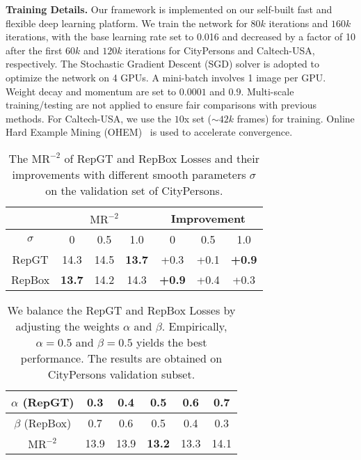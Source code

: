 \documentclass[10pt,twocolumn,letterpaper]{article}
\newcommand{\myparagraph}[1]{{\vspace{0.5em} \noindent \bf #1}}
\begin{document}
\myparagraph{Training Details.} Our framework is implemented on our self-built fast and flexible deep learning platform. We train the network for $80k$ iterations and $160k$ iterations, with the base learning rate set to 0.016 and decreased by a factor of 10 after the first $60k$ and $120k$ iterations for CityPersons and Caltech-USA, respectively. The Stochastic Gradient Descent (SGD) solver is adopted to optimize the network on 4 GPUs. A mini-batch involves 1 image per GPU. Weight decay and momentum are set to $0.0001$ and $0.9$. Multi-scale training/testing are not applied to ensure fair comparisons with previous methods. For Caltech-USA, we use the $10$x set (${\sim}42k$ frames) for training. Online Hard Example Mining (OHEM)~\cite{shrivastava2016training} is used to accelerate convergence.




\begin{table}[!tbp]
\begin{center}
\setlength{\tabcolsep}{5pt}
\begin{tabular}{|c|c|c|c|c|c|c|}
\hline
  & \multicolumn{3}{c|}{$\mathrm{MR}^{-2}$} & \multicolumn{3}{c|}{Improvement} \\
\hline
$\sigma$ & 0 & 0.5 & 1.0 & 0 & 0.5 & 1.0 \\
\hline
RepGT & 14.3 & 14.5 & {\bf 13.7} & +0.3 & +0.1 & {\bf +0.9}  \\
\hline
RepBox & {\bf 13.7} & 14.2 & 14.3 & {\bf +0.9} & +0.4 & +0.3  \\
\hline
\end{tabular}
\end{center}
\caption{The $\mathrm{MR}^{-2}$ of RepGT and RepBox Losses and their improvements with different smooth parameters $\sigma$ on the validation set of CityPersons.}
\label{tab:citypersons_reasonable_ablation_sigma}
\end{table}

\begin{table}[!tbp]
\begin{center}
\setlength{\tabcolsep}{5pt}
\begin{tabular}{|c|c|c|c|c|c|}
\hline
 $\alpha$ (RepGT) & 0.3 & 0.4 & 0.5 & 0.6 & 0.7 \\
\hline
$\beta$ (RepBox) & 0.7 & 0.6 & 0.5 & 0.4 & 0.3 \\
\hline
$\mathrm{MR}^{-2}$ & 13.9 & 13.9 & {\bf 13.2} & 13.3 & 14.1  \\
\hline
\end{tabular}
\end{center}
\caption{We balance the RepGT and RepBox Losses by adjusting the weights $\alpha$ and $\beta$. Empirically, $\alpha=0.5$ and $\beta=0.5$ yields the best performance. The results are obtained on CityPersons validation subset.}
\vspace{-0.2cm}
\label{tab:citypersons_reasonable_ablation_combination}
\end{table}
\end{document}
